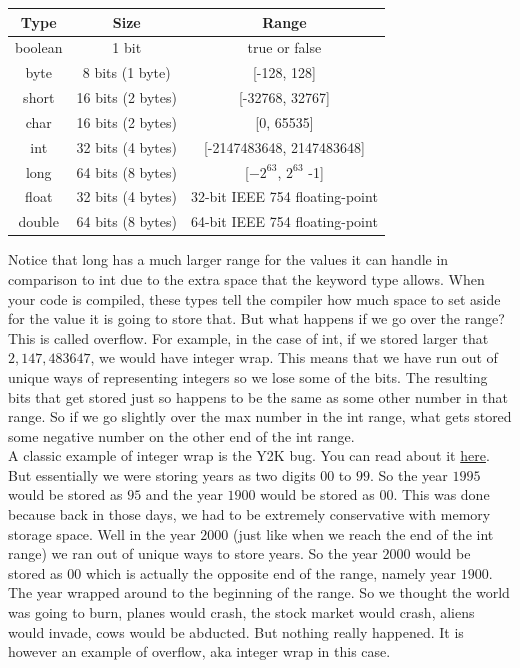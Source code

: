 \documentclass[11]{article}
\begin{document}
\begin{center}
  \begin{tabular}{ | c | c | c | }
    \hline
    Type & Size & Range \\ \hline
    boolean & 1 bit & true or false \\ \hline
    byte & 8 bits (1 byte) & [-128, 128] \\  \hline
    short & 16 bits (2 bytes) & [-32768, 32767] \\ \hline
    char & 16 bits (2 bytes) & [0, 65535] \\ \hline
    int & 32 bits (4 bytes) & [-2147483648, 2147483648] \\ \hline
    long & 64 bits (8 bytes) & [$-2^{63}$, $2^{63}$ -1] \\ \hline
    float & 32 bits (4 bytes) & 32-bit IEEE 754 floating-point \\ \hline
    double & 64 bits (8 bytes) & 64-bit IEEE 754 floating-point\\
    \hline
  \end{tabular}
\end{center}

Notice that long has a much larger range for the values it can handle in comparison to int due to the extra space that the keyword type allows. When your code is compiled, these types tell the compiler how much space to set aside for the value it is going to store that. But what happens if we go over the range? This is called overflow. For example, in the case of int, if we stored larger that $2,147,483647$, we would have integer wrap. This means that we have run out of unique ways of representing integers so we lose some of the bits. The resulting bits that get stored just so happens to be the same as some other number in that range. So if we go slightly over the max number in the int range, what gets stored some negative number on the other end of the int range. \\

A classic example of integer wrap is the Y2K bug. You can read about it \href{https://searchwindowsserver.techtarget.com/definition/Y2K-year-2000}{here}. But essentially we were storing years as two digits $00$ to $99$. So the year $1995$ would be stored as $95$ and the year $1900$ would be stored as $00$. This was done because back in those days, we had to be extremely conservative with memory storage space. Well in the year $2000$ (just like when we reach the end of the int range) we ran out of unique ways to store years. So the year $2000$ would be stored as $00$ which is actually the opposite end of the range, namely year $1900$. The year wrapped around to the beginning of the range. So we thought the world was going to burn, planes would crash, the stock market would crash, aliens would invade, cows would be abducted. But nothing really happened. It is however an example of overflow, aka integer wrap in this case. \\
\end{document}
